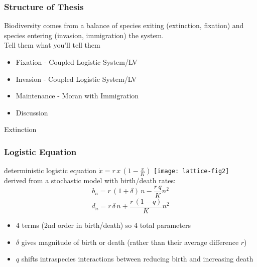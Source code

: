 \documentclass[dvipsnames]{beamer}
\begin{document}
\begin{frame}
\frametitle{Structure of Thesis}
Biodiversity comes from a balance of species exiting (extinction, fixation) and species entering (invasion, immigration) the system. \\
\Large{Tell them what you'll tell them}
\begin{itemize}
	\item Fixation - Coupled Logistic System/LV
	\item Invasion - Coupled Logistic System/LV
	\item Maintenance - Moran with Immigration
	\item Discussion
\end{itemize}
\end{frame}



\begin{frame}
\centering
{{\Huge Extinction}}
\end{frame}

\begin{frame}
\frametitle{Logistic Equation}
deterministic logistic equation $\dot{x} = r \, x \, \left(1-\frac{x}{K}\right)$
\pause
\centering
\texttt{[image: lattice-fig2]} \\
\pause
derived from a stochastic model with birth/death rates:
\begin{equation*}
b_n = r\,(1 + \delta)\,n - \frac{r\,q}{K}n^2%
\end{equation*}
\begin{equation*}
d_n = r\,\delta\,n + \frac{r\,(1-q)}{K} n^2%
\end{equation*}
\vspace{-0.2cm}
\pause
\begin{itemize}
\item 4 terms (2nd order in birth/death) so 4 total parameters
\item $\delta$ gives magnitude of birth or death (rather than their average difference $r$)
\item $q$ shifts intraspecies interactions between reducing birth and increasing death
\end{itemize}
\end{frame}
\end{document}
